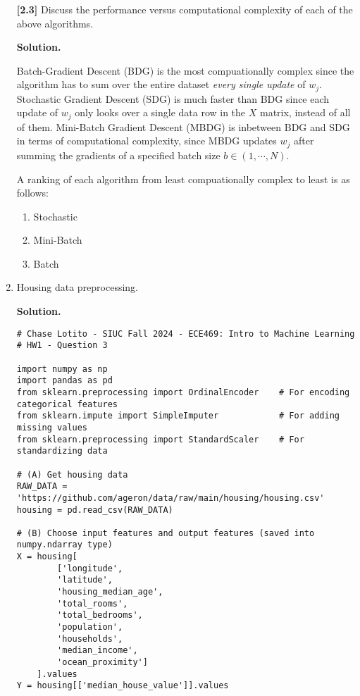 \documentclass[11pt]{article}
\begin{document}
\begin{enumerate}[start=1,label={\bfseries Question \arabic*:},leftmargin=1in]
        \textbf{[2.3]} Discuss the performance versus computational complexity of each of the above algorithms.

        \textbf{Solution.}

        Batch-Gradient Descent (BDG) is the most compuationally complex since the algorithm has to sum over the entire dataset \emph{every single update} of \(w_j\). Stochastic Gradient Descent (SDG) is much faster than BDG since each update of \(w_j\) only looks over a single data row in the \(X\) matrix, instead of all of them. Mini-Batch Gradient Descent (MBDG) is inbetween BDG and SDG in terms of computational complexity, since MBDG updates \(w_j\) after summing the gradients of a specified batch size \(b \in (1, \cdots, N)\).
        
        \noindent A ranking of each algorithm from least compuationally complex to least is as follows:

        \begin{enumerate}[label=(\arabic*)]
            \item Stochastic
            \item Mini-Batch 
            \item Batch
        \end{enumerate}

        \item Housing data preprocessing.
        
        \textbf{Solution.}

        \begin{lstlisting}
# Chase Lotito - SIUC Fall 2024 - ECE469: Intro to Machine Learning
# HW1 - Question 3

import numpy as np
import pandas as pd
from sklearn.preprocessing import OrdinalEncoder    # For encoding categorical features
from sklearn.impute import SimpleImputer            # For adding missing values
from sklearn.preprocessing import StandardScaler    # For standardizing data

# (A) Get housing data
RAW_DATA = 'https://github.com/ageron/data/raw/main/housing/housing.csv'
housing = pd.read_csv(RAW_DATA)

# (B) Choose input features and output features (saved into numpy.ndarray type)
X = housing[
        ['longitude',
        'latitude',
        'housing_median_age',
        'total_rooms',
        'total_bedrooms',
        'population',
        'households',
        'median_income',
        'ocean_proximity']
    ].values
Y = housing[['median_house_value']].values


\end{lstlisting}
\end{enumerate}
\end{document}
